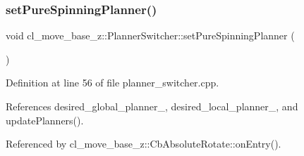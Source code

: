 \subsubsection{\texorpdfstring{set\+Pure\+Spinning\+Planner()}{setPureSpinningPlanner()}}
{\footnotesize\ttfamily void cl\+\_\+move\+\_\+base\+\_\+z\+::\+Planner\+Switcher\+::set\+Pure\+Spinning\+Planner (\begin{DoxyParamCaption}{ }\end{DoxyParamCaption})}



Definition at line 56 of file planner\+\_\+switcher.\+cpp.



References desired\+\_\+global\+\_\+planner\+\_\+, desired\+\_\+local\+\_\+planner\+\_\+, and update\+Planners().



Referenced by cl\+\_\+move\+\_\+base\+\_\+z\+::\+Cb\+Absolute\+Rotate\+::on\+Entry().


